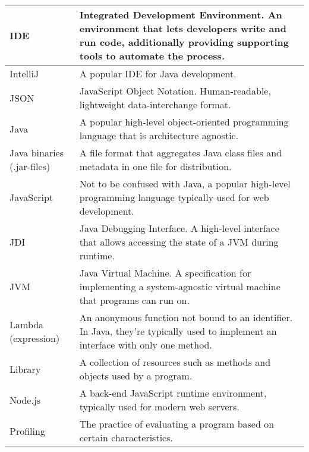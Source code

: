 \begin{tabularx}{\linewidth}{|l|X|}
\rowcolor[HTML]{CBCEFB} 
IDE &
  Integrated Development Environment. An environment that lets developers write and run code, additionally providing supporting tools to automate the process. \\ \hline
IntelliJ                    & A popular IDE for Java development.                                                                                   \\ \hline
\rowcolor[HTML]{CBCEFB} 
JSON                        & JavaScript Object Notation. Human-readable, lightweight data-interchange format.                                      \\ \hline
\rowcolor[HTML]{FFFFFF} 
Java                        & A popular high-level object-oriented programming language that is architecture agnostic.                              \\ \hline
\rowcolor[HTML]{CBCEFB} 
Java binaries (.jar-files)  & A file format that aggregates Java class files and metadata in one file for distribution.                             \\ \hline
\rowcolor[HTML]{FFFFFF} 
JavaScript                  & Not to be confused with Java, a popular high-level programming language typically used for web development.           \\ \hline
\rowcolor[HTML]{CBCEFB} 
JDI                         & Java Debugging Interface. A high-level interface that allows accessing the state of a JVM during runtime.             \\ \hline
\rowcolor[HTML]{FFFFFF} 
JVM                         & Java Virtual Machine. A specification for implementing a system-agnostic virtual machine that programs can run on.    \\ \hline
\rowcolor[HTML]{CBCEFB} 
Lambda (expression) &
  An anonymous function not bound to an identifier. In Java, they're typically used to implement an interface with only one method. \\ \hline
\rowcolor[HTML]{FFFFFF} 
Library                     & A collection of resources such as methods and objects used by a program.                                              \\ \hline
\rowcolor[HTML]{CBCEFB} 
Node.js                     & A back-end JavaScript runtime environment, typically used for modern web servers.                                     \\ \hline
\rowcolor[HTML]{FFFFFF} 
Profiling                   & The practice of evaluating a program based on certain characteristics.                                                \\ \hline

\end{tabularx}
